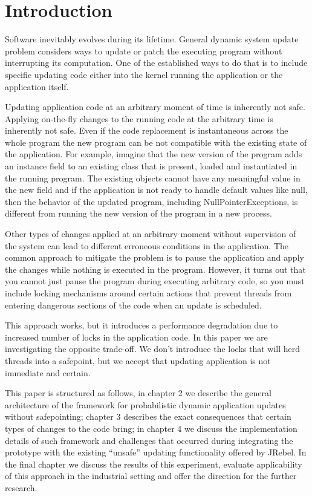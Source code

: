 \section*{Introduction}

Software inevitably evolves during its lifetime. General dynamic system update
problem considers ways to update or patch the executing program without
interrupting its computation. One of the established ways to do that is to
include specific updating code either into the kernel running the application or
the application itself.

Updating application code at an arbitrary moment of time is inherently not safe.
Applying on-the-fly changes to the running code at the arbitrary time is
inherently not safe. Even if the code replacement is instantaneous across the
whole program the new program can be not compatible with the existing state of
the application.
For example, imagine that the new version of the program adds an instance field
to an existing class that is present, loaded and instantiated in the running
program.
The existing objects cannot have any meaningful value in the new field and if
the application is not ready to handle default values like null, then the
behavior of the updated program, including NullPointerExceptions, is different
from running the new version of the program in a new process.

Other types of changes applied at an arbitrary moment without supervision of the
system can lead to different erroneous conditions in the application. The common
approach to mitigate the problem is to pause the application and apply the
changes while nothing is executed in the program.
However, it turns out that you cannot just pause the program during executing
arbitrary code, so you must include locking mechanisms around certain actions
that prevent threads from entering dangerous sections of the code when an update
is scheduled.

This approach works, but it introduces a performance degradation due to
increased number of locks in the application code. In this paper we are
investigating the opposite trade-off. We don’t introduce the locks that will
herd threads into a safepoint, but we accept that updating application is not
immediate and certain.

This paper is structured as follows, in chapter 2 we describe the general
architecture of the framework for probabilistic dynamic application updates
without safepointing; chapter 3 describes the exact consequences that certain
types of changes to the code bring; in chapter 4 we discuss the implementation
details of such framework and challenges that occurred during integrating the
prototype with the existing “unsafe” updating functionality offered by JRebel.
In the final chapter we discuss the results of this experiment, evaluate
applicability of this approach in the industrial setting and offer the direction
for the further research.
